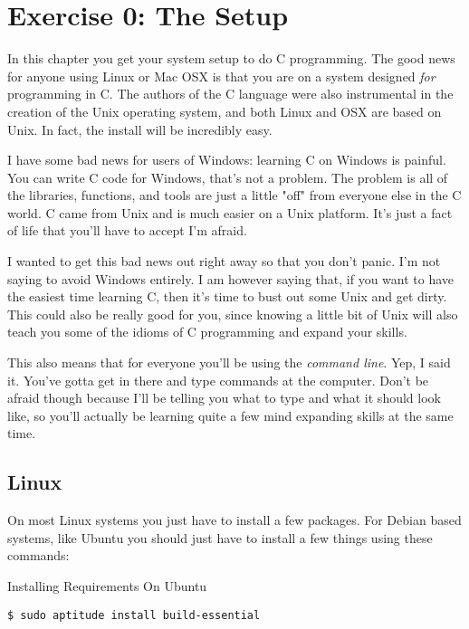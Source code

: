 \chapter{Exercise 0: The Setup}

In this chapter you get your system setup to do C programming.  The
good news for anyone using Linux or Mac OSX is that you are on a
system designed \emph{for} programming in C.  The authors of the
C language were also instrumental in the creation of the Unix operating
system, and both Linux and OSX are based on Unix.  In fact, the install
will be incredibly easy.

I have some bad news for users of Windows:  learning C on Windows
is painful.  You can write C code for Windows, that's not a problem.
The problem is all of the libraries, functions, and tools are just
a little "off" from everyone else in the C world.  C came from
Unix and is much easier on a Unix platform.  It's just a fact 
of life that you'll have to accept I'm afraid.

I wanted to get this bad news out right away so that you don't
panic.  I'm not saying to avoid Windows entirely.  I am however
saying that, if you want to have the easiest time learning C, then
it's time to bust out some Unix and get dirty.  This could also
be really good for you, since knowing a little bit of Unix will
also teach you some of the idioms of C programming and expand
your skills.

This also means that for everyone you'll be using the 
\emph{command line}.  Yep, I said it.  You've gotta get in there and
type commands at the computer.  Don't be afraid though because
I'll be telling you what to type and what it should look like,
so you'll actually be learning quite a few mind expanding 
skills at the same time.

\section{Linux}

On most Linux systems you just have to install a few packages.  For 
Debian based systems, like Ubuntu you should just have to install
a few things using these commands:

\begin{code}{Installing Requirements On Ubuntu}
\begin{lstlisting}
$ sudo aptitude install build-essential
\end{lstlisting}
\end{code}

